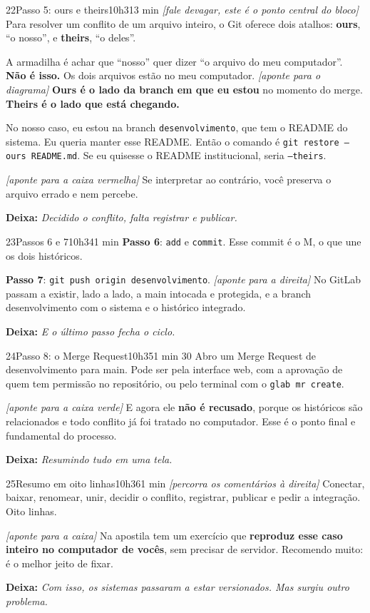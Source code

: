 \documentclass[11pt,a4paper]{article}
\newcommand{\acao}[1]{{\color{ouroMB!75!black}\small\itshape [#1]}}
\newcommand{\deixa}[1]{\par{\color{verdeMB}\small\bfseries \faLongArrowAltRight\; Deixa:} {\small\itshape #1}}
\newcommand{\cmd}[1]{\texttt{\color{azulMB}#1}}
\begin{document}
\begin{slide}{22}{Passo 5: ours e theirs}{10h31}{3 min}
\acao{fale devagar, este é o ponto central do bloco}
Para resolver um conflito de um arquivo inteiro, o Git oferece dois atalhos: \textbf{ours}, \enquote{o nosso}, e \textbf{theirs}, \enquote{o deles}.

A armadilha é achar que \enquote{nosso} quer dizer \enquote{o arquivo do meu computador}. \textbf{Não é isso.} Os dois arquivos estão no meu computador. \acao{aponte para o diagrama} \textbf{Ours é o lado da branch em que eu estou} no momento do merge. \textbf{Theirs é o lado que está chegando.}

No nosso caso, eu estou na branch \texttt{desenvolvimento}, que tem o README do sistema. Eu queria manter esse README. Então o comando é \cmd{git restore --ours README.md}. Se eu quisesse o README institucional, seria \cmd{--theirs}.

\acao{aponte para a caixa vermelha} Se interpretar ao contrário, você preserva o arquivo errado e nem percebe.
\deixa{Decidido o conflito, falta registrar e publicar.}
\end{slide}

\begin{slide}{23}{Passos 6 e 7}{10h34}{1 min}
\textbf{Passo 6}: \cmd{add} e \cmd{commit}. Esse commit é o M, o que une os dois históricos.

\textbf{Passo 7}: \cmd{git push origin desenvolvimento}. \acao{aponte para a direita} No GitLab passam a existir, lado a lado, a main intocada e protegida, e a branch desenvolvimento com o sistema e o histórico integrado.
\deixa{E o último passo fecha o ciclo.}
\end{slide}

\begin{slide}{24}{Passo 8: o Merge Request}{10h35}{1 min 30}
Abro um Merge Request de desenvolvimento para main. Pode ser pela interface web, com a aprovação de quem tem permissão no repositório, ou pelo terminal com o \cmd{glab mr create}.

\acao{aponte para a caixa verde} E agora ele \textbf{não é recusado}, porque os históricos são relacionados e todo conflito já foi tratado no computador. Esse é o ponto final e fundamental do processo.
\deixa{Resumindo tudo em uma tela.}
\end{slide}

\begin{slide}{25}{Resumo em oito linhas}{10h36}{1 min}
\acao{percorra os comentários à direita}
Conectar, baixar, renomear, unir, decidir o conflito, registrar, publicar e pedir a integração. Oito linhas.

\acao{aponte para a caixa} Na apostila tem um exercício que \textbf{reproduz esse caso inteiro no computador de vocês}, sem precisar de servidor. Recomendo muito: é o melhor jeito de fixar.
\deixa{Com isso, os sistemas passaram a estar versionados. Mas surgiu outro problema.}
\end{slide}
\end{document}
